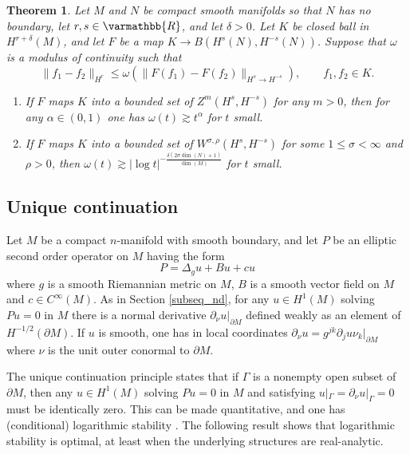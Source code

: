 \documentclass[12pt,twoside]{amsart}
\numberwithin{equation}{section}
\renewcommand{\leq}{\leqslant}
\renewcommand{\mathbb}{\varmathbb}
\newtheorem{theorem}{Theorem}[section]
\newcommand {\p} {\partial}
\newcommand{\mR}{\mathbb{R}}                    %
\newcommand{\abs}[1]{\lvert #1 \rvert}          %
\newcommand{\norm}[1]{\lVert #1 \rVert}         %
\begin{document}
\begin{theorem} \label{thm_smoothing_instability_dnmap}
Let $M$ and $N$ be compact smooth manifolds so that $N$ has no boundary, let $r, s \in \mR$, and let $\delta > 0$. Let $K$ be  closed ball in $H^{r+\delta}(M)$, and let $F$ be a map $K \to B(H^s(N), H^{-s}(N))$. Suppose that $\omega$ is a modulus of continuity such that 
\[
\norm{f_1-f_2}_{H^r} \leq \omega(\norm{F(f_1) - F(f_2)}_{H^s \to H^{-s}}), \qquad f_1, f_2 \in K.
\]
\begin{enumerate}
\item[(a)] 
If $F$ maps $K$ into a bounded set of $Z^m(H^s,H^{-s})$ for any $m > 0$, then for any $\alpha \in (0,1)$ one has $\omega(t) \gtrsim t^{\alpha}$ for $t$ small.
\item[(b)] 
If $F$ maps $K$ into a bounded set of $W^{\sigma,\rho}(H^s, H^{-s})$ for some $1 \leq \sigma < \infty$ and $\rho > 0$, then $\omega(t) \gtrsim \abs{\log t}^{-\frac{\delta(2 \sigma \dim(N) +1)}{\dim(M)}}$ for $t$ small.
\end{enumerate}
\end{theorem}




\subsection{Unique continuation}

Let $M$ be a compact $n$-manifold with smooth boundary, and let $P$ be an elliptic second order operator on $M$ having the form 
\[
P = \Delta_g u + Bu + cu
\]
where $g$ is a smooth Riemannian metric on $M$, $B$ is a smooth vector field on $M$ and $c \in C^{\infty}(M)$. As in Section \ref{subseq_nd}, for any $u \in H^1(M)$ solving $Pu = 0$ in $M$ there is a normal derivative $\p_{\nu} u|_{\p M}$ defined weakly as an element of $H^{-1/2}(\p M)$. If $u$ is smooth, one has in local coordinates $\p_{\nu} u = g^{jk} \p_j u \nu_k|_{\p M}$ where $\nu$ is the unit outer conormal to $\p M$.

The unique continuation principle states that if $\Gamma$ is a nonempty open subset of $\p M$, then any $u \in H^1(M)$ solving $Pu = 0$ in $M$ and satisfying $u|_{\Gamma} = \p_{\nu} u|_{\Gamma} = 0$ must be identically zero. This can be made quantitative, and one has (conditional) logarithmic stability \cite{AlessandriniRondiRossetVessella}. The following result shows that logarithmic stability is optimal, at least when the underlying structures are real-analytic.
\end{document}
